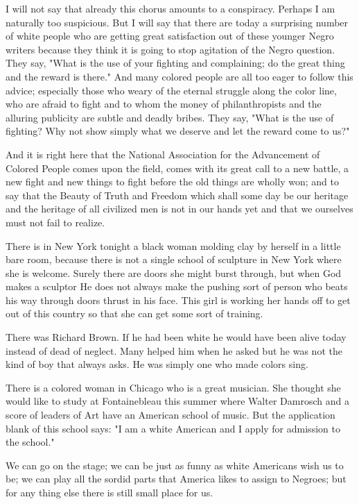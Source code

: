 \documentclass[12pt]{article}
\begin{document}
{\duboispara}%
I will not say that already this chorus amounts to a conspiracy. Perhaps I am naturally too suspicious. But I will say that there are today a surprising number of white people who are getting great satisfaction out of these younger Negro writers because they think it is going to stop agitation of the Negro question. They say, "What is the use of your fighting and complaining; do the great thing and the reward is there." And many colored people are all too eager to follow this advice; especially those who weary of the eternal struggle along the color line, who are afraid to fight and to whom the money of philanthropists and the alluring publicity are subtle and deadly bribes. They say, "What is the use of fighting? Why not show simply what we deserve and let the reward come to us?" 

{\duboispara}%
And it is right here that the National Association for the Advancement of Colored People comes upon the field, comes with its great call to a new battle, a new fight and new things to fight before the old things are wholly won; and to say that the Beauty of Truth and Freedom which shall some day be our heritage and the heritage of all civilized men is not in our hands yet and that we ourselves must not fail to realize. 

{\duboispara}%
There is in New York tonight a black woman molding clay by herself in a little bare room, because there is not a single school of sculpture in New York where she is welcome. Surely there are doors she might burst through, but when God makes a sculptor He does not always make the pushing sort of person who beats his way through doors thrust in his face. This girl is working her hands off to get out of this country so that she can get some sort of training. 

{\duboispara}%
There was Richard Brown. If he had been white he would have been alive today instead of dead of neglect. Many helped him when he asked but he was not the kind of boy that always asks. He was simply one who made colors sing. 

{\duboispara}%
There is a colored woman in Chicago who is a great musician. She thought she would like to study at Fontainebleau this summer where Walter Damrosch and a score of leaders of Art have an American school of music. But the application blank of this school says: "I am a white American and I apply for admission to the school." 

{\duboispara}%
We can go on the stage; we can be just as funny as white Americans wish us to be; we can play all the sordid parts that America likes to assign to Negroes; but for any thing else there is still small place for us. 
\end{document}
